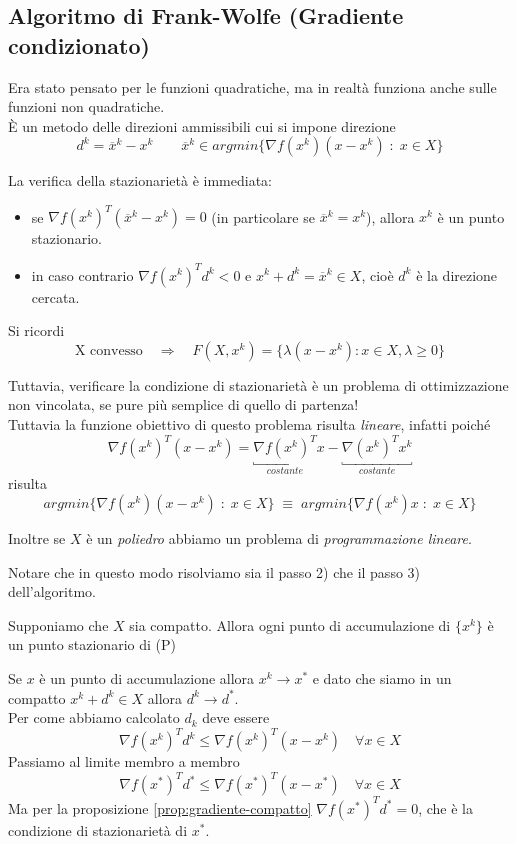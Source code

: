 \subsection{Algoritmo di Frank-Wolfe (Gradiente condizionato)}
Era stato pensato per le funzioni quadratiche, ma in realt\`a funziona
anche sulle funzioni non quadratiche. \\
\`E un metodo delle direzioni ammissibili cui si impone direzione
$$ d^{k} = \overline{x}^{k} - x^{k} \qquad 
\overline{x}^{k} \in argmin \{\nabla f(x^{k})(x -x^{k}) \; : \; x \in X \}
$$

La verifica della stazionariet\`a \`e immediata:
\begin{itemize}
\item se $\nabla f(x^{k})^{T}(\overline{x}^{k} - x^{k})=0$ (in
  particolare se $\overline{x}^{k}=x^{k}$), allora $x^{k}$ \`e
  un punto stazionario. 
\item in caso contrario
  $\nabla f(x^{k})^{T}d^{k} < 0$ e $x^{k} + d^{k} = \overline{x}^{k} \in X$, 
  cio\`e $d^{k}$ \`e la direzione cercata.
\end{itemize}
\begin{notes}
Si ricordi
$$ \text{X convesso} \quad \Rightarrow \quad 
F(X, x^{k}) = \{ \lambda (x - x^{k}) : x \in X, \lambda \geq 0 \} $$
\end{notes}

Tuttavia, verificare la condizione di stazionarietà \`e un problema di ottimizzazione non vincolata, se pure più semplice di quello di partenza!\\ 
Tuttavia la funzione obiettivo di questo problema risulta \emph{lineare},
infatti poiché 
$$ \nabla f(x^{k})^{T} (x-x^k) = \underbracket{\nabla f(x^{k})^{T}}_{costante} x -
\underbracket{\nabla (x^{k})^{T}x^k}_{costante} $$ 
risulta
$$ argmin \{\nabla f(x^{k})(x -x^{k}) \; : \; x \in X \} \;\equiv\;
   argmin \{\nabla f(x^{k})x \; : \; x \in X \} $$

Inoltre se $X$ \`e un \emph{poliedro} abbiamo un problema di 
\emph{programmazione lineare}.

Notare che in questo modo risolviamo sia il passo 2) che il passo 3) dell'algoritmo.


\begin{theo}[Convergenza]
  Supponiamo che $X$ sia compatto. Allora ogni punto
  di accumulazione di $\{x^{k}\}$ \`e un punto stazionario di (P)
\end{theo}
\begin{thproof}
  Se $x$ è un punto di accumulazione allora $x^k \rightarrow x^{*}$ e
  dato che siamo in un compatto $x^k + d^k \in X$ allora $d^k
  \rightarrow d^{*}$.\\
  Per come abbiamo calcolato $d_k$ deve essere
  $$ \nabla f(x^{k})^{T} d^k \leq \nabla f(x^{k})^{T} (x -x^{k})
  \quad \forall x \in X$$
  Passiamo al limite membro a membro
  $$ \nabla f(x^{*})^{T} d^{*}
  \leq \nabla f(x^{*})^{T}(x-x^{*}) \quad \forall x \in X$$
  Ma per la proposizione \ref{prop:gradiente-compatto} $\nabla
  f(x^{*})^{T} d^{*} = 0$, che è la condizione di stazionariet\`a di $x^{*}$.
\end{thproof}

